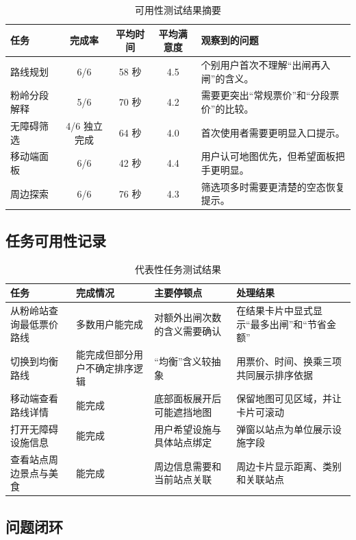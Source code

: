 \documentclass[UTF8,a4paper,11pt]{ctexart}
\begin{document}
\begin{table}[H]
  \centering
  \caption{可用性测试结果摘要}
  \begin{tabularx}{\textwidth}{lcccY}
    \toprule
    任务 & 完成率 & 平均时间 & 平均满意度 & 观察到的问题 \\
    \midrule
    路线规划 & 6/6 & 58 秒 & 4.5 & 个别用户首次不理解“出闸再入闸”的含义。 \\
    粉岭分段解释 & 5/6 & 70 秒 & 4.2 & 需要更突出“常规票价”和“分段票价”的比较。 \\
    无障碍筛选 & 4/6 独立完成 & 64 秒 & 4.0 & 首次使用者需要更明显入口提示。 \\
    移动端面板 & 6/6 & 42 秒 & 4.4 & 用户认可地图优先，但希望面板把手更明显。 \\
    周边探索 & 6/6 & 76 秒 & 4.3 & 筛选项多时需要更清楚的空态恢复提示。 \\
    \bottomrule
  \end{tabularx}
\end{table}

\subsection{任务可用性记录}

\begin{table}[H]
  \centering
  \caption{代表性任务测试结果}
  \begin{tabularx}{\textwidth}{p{}p{}p{}Y}
    \toprule
    任务 & 完成情况 & 主要停顿点 & 处理结果 \\
    \midrule
    从粉岭站查询最低票价路线 & 多数用户能完成 & 对额外出闸次数的含义需要确认 & 在结果卡片中显式显示“最多出闸”和“节省金额” \\
    切换到均衡路线 & 能完成但部分用户不确定排序逻辑 & “均衡”含义较抽象 & 用票价、时间、换乘三项共同展示排序依据 \\
    移动端查看路线详情 & 能完成 & 底部面板展开后可能遮挡地图 & 保留地图可见区域，并让卡片可滚动 \\
    打开无障碍设施信息 & 能完成 & 用户希望设施与具体站点绑定 & 弹窗以站点为单位展示设施字段 \\
    查看站点周边景点与美食 & 能完成 & 周边信息需要和当前站点关联 & 周边卡片显示距离、类别和关联站点 \\
    \bottomrule
  \end{tabularx}
\end{table}

\subsection{问题闭环}
\end{document}
